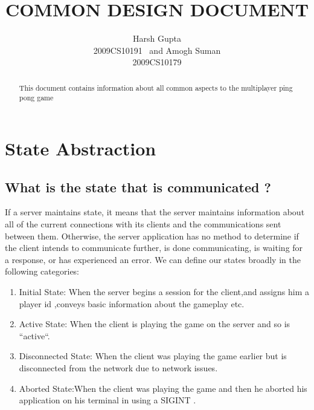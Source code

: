 \setlength{\topmargin}{-.5in}
\setlength{\textheight}{9in}
\setlength{\oddsidemargin}{.125in}
\setlength{\textwidth}{6.25in}

\title
{COMMON DESIGN DOCUMENT}
\author
{Harsh Gupta \\ 2009CS10191 \ and  Amogh Suman \\ 2009CS10179}
\renewcommand{\today}{September 15, 2010}
\maketitle 
\begin{abstract}
This document contains information about all common aspects to the multiplayer
  ping pong game
\end{abstract}
\pagebreak 
\section{State Abstraction}
\subsection{What is the state that is communicated ?}
 If a server maintains state, it means that the server maintains
information about all of the current connections with its clients and the communications sent between them. Otherwise, the server application has no method to determine if the client
intends to communicate further, is done communicating, is waiting for a
response, or has experienced an error.
We can define our states broadly in the following categories:
\begin{enumerate}
 \item Initial State: When the server begins a session for the client,and assigns him a player id ,conveys basic information about the gameplay etc.
 \item Active State: When the client is playing the game on the server and so is ``active``.
\item Disconnected State: When the client was playing the game earlier but is disconnected from the network due to network issues.
\item Aborted State:When the client was playing the game and then he aborted his application on his terminal in using a SIGINT .
\end{enumerate}

